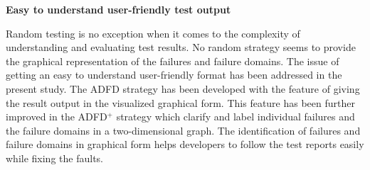 




\textbf{Easy to understand user-friendly test output}

Random testing is no exception when it comes to the complexity of understanding and evaluating test results. No random strategy seems to provide the graphical representation of the failures and failure domains. The issue of getting an easy to understand user-friendly format has been addressed in the present study. The ADFD strategy has been developed with the feature of giving the result output in the visualized graphical form. This feature has been further improved in the ADFD$^+$ strategy which clarify and label individual failures and the failure domains in a two-dimensional graph. The identification of failures and failure domains in graphical form helps developers to follow the test reports easily while fixing the faults.  \\


